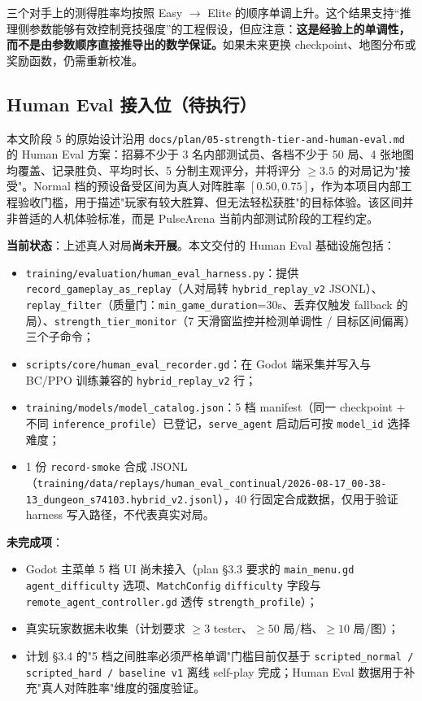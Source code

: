 \documentclass[UTF8,a4paper,11pt]{ctexart}
\begin{document}
三个对手上的测得胜率均按照 Easy $\rightarrow$ Elite 的顺序单调上升。这个结果支持“推理侧参数能够有效控制竞技强度”的工程假设，但应注意：\textbf{这是经验上的单调性，而不是由参数顺序直接推导出的数学保证。}如果未来更换 checkpoint、地图分布或奖励函数，仍需重新校准。

\subsection{Human Eval 接入位（待执行）}\label{sec:human_eval}
本文阶段 5 的原始设计沿用 \texttt{docs/plan/05-strength-tier-and-human-eval.md} 的 Human Eval 方案：招募不少于 3 名内部测试员、各档不少于 50 局、4 张地图均覆盖、记录胜负、平均时长、5 分制主观评分，并将评分 $\ge3.5$ 的对局记为"接受"。Normal 档的预设备受区间为真人对阵胜率 $[0.50,0.75]$，作为本项目内部工程验收门槛，用于描述"玩家有较大胜算、但无法轻松获胜"的目标体验。该区间并非普适的人机体验标准，而是 PulseArena 当前内部测试阶段的工程约定。

\textbf{当前状态}：上述真人对局\textbf{尚未开展}。本文交付的 Human Eval 基础设施包括：

\begin{itemize}
    \item \texttt{training/evaluation/human\_eval\_harness.py}：提供 \texttt{record\_gameplay\_as\_replay}（人对局转 \texttt{hybrid\_replay\_v2} JSONL）、\texttt{replay\_filter}（质量门：\texttt{min\_game\_duration}=30s、丢弃仅触发 fallback 的局）、\texttt{strength\_tier\_monitor}（7 天滑窗监控并检测单调性 / 目标区间偏离）三个子命令；
    \item \texttt{scripts/core/human\_eval\_recorder.gd}：在 Godot 端采集并写入与 BC/PPO 训练兼容的 \texttt{hybrid\_replay\_v2} 行；
    \item \texttt{training/models/model\_catalog.json}：5 档 manifest（同一 checkpoint + 不同 \texttt{inference\_profile}）已登记，\texttt{serve\_agent} 启动后可按 \texttt{model\_id} 选择难度；
    \item 1 份 \texttt{record-smoke} 合成 JSONL（\texttt{training/data/replays/human\_eval\_continual/2026-08-17\_00-38-13\_dungeon\_s74103.hybrid\_v2.jsonl}），40 行固定合成数据，仅用于验证 harness 写入路径，不代表真实对局。
\end{itemize}

\textbf{未完成项}：

\begin{itemize}
    \item Godot 主菜单 5 档 UI 尚未接入（plan §3.3 要求的 \texttt{main\_menu.gd} \texttt{agent\_difficulty} 选项、\texttt{MatchConfig} \texttt{difficulty} 字段与 \texttt{remote\_agent\_controller.gd} 透传 \texttt{strength\_profile}）；
    \item 真实玩家数据未收集（计划要求 $\ge3$ tester、$\ge50$ 局/档、$\ge10$ 局/图）；
    \item 计划 §3.4 的"5 档之间胜率必须严格单调"门槛目前仅基于 \texttt{scripted\_normal / scripted\_hard / baseline v1} 离线 self-play 完成；Human Eval 数据用于补充"真人对阵胜率"维度的强度验证。
\end{itemize}
\end{document}
